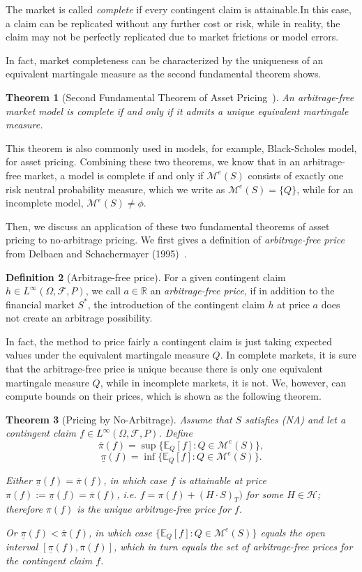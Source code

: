 \documentclass[a4paper]{article}
\newtheorem{theorem}{Theorem}[section]
\theoremstyle{definition}
\newtheorem{definition}[theorem]{Definition}
\numberwithin{equation}{section}
\begin{document}
The market is called \emph{complete} if every contingent claim is attainable.In this case, a claim can be replicated without any further cost or risk, while in reality, the claim may not be perfectly replicated due to market frictions or model errors.

In fact, market completeness can be characterized by the uniqueness of an equivalent martingale measure as the second fundamental theorem shows.
\begin{theorem}[Second Fundamental Theorem of Asset Pricing~\cite{book4}]
An arbitrage-free market model is complete if and only if it admits a unique equivalent martingale measure.
\end{theorem}
This theorem is also commonly used in models, for example, Black-Scholes model, for asset pricing. Combining these two theorems, we know that in an arbitrage-free market, a model is complete if and only if $\mathcal M^e(S)$ consists of exactly one risk neutral probability measure, which we write as $\mathcal M^e(S)=\{Q\}$, while for an incomplete model, $\mathcal M^e(S)\neq\phi$.
 
Then, we discuss an application of these two fundamental theorems of asset pricing to no-arbitrage pricing. We first gives a definition of \emph{arbitrage-free price} from Delbaen and Schachermayer (1995)~\cite{book1}.
\begin{definition}[Arbitrage-free price]
For a given contingent claim $h\in L^\infty(\Omega,\mathcal F,P)$, we call $a\in\mathbb R$ an \emph{arbitrage-free price}, if in addition to the financial market $S^*$, the introduction of the contingent claim $h$ at price $a$ does not create an arbitrage possibility.
\end{definition}
In fact, the method to price fairly a contingent claim is just taking expected values under the equivalent martingale measure $Q$. In complete markets, it is sure that the arbitrage-free price is unique because there is only one equivalent martingale measure $Q$, while in incomplete markets, it is not. We, however, can compute bounds on their prices, which is shown as the following theorem.

\begin{theorem}[Pricing by No-Arbitrage\cite{book paper}]\label{th:no_arbitrage_price}
Assume that $S$ satisfies (NA) and let a contingent claim $f\in L^\infty(\Omega,\mathcal F,P)$. Define
$$\overline\pi(f)=\sup\{\mathbb E_Q[f]:Q\in\mathcal M^e(S)\},$$
$$\underline\pi(f)=\inf\{\mathbb E_Q[f]:Q\in\mathcal M^e(S)\}.$$

Either $\underline\pi(f)=\overline\pi(f)$, in which case $f$ is attainable at price $\pi(f):=\underline\pi(f)=\overline\pi(f)$, i.e. $f=\pi(f)+(H\cdot S)_T)$ for some $H\in\mathcal H$; therefore $\pi(f)$ is the unique arbitrage-free price for $f$.

Or $\underline\pi(f)<\overline\pi(f)$, in which case $\{\mathbb E_Q[f]:Q\in\mathcal M^e(S)\}$ equals the open interval $[\underline\pi(f),\overline\pi(f)]$, which in turn equals the set of arbitrage-free prices for the contingent claim $f$.
\end{theorem}
\end{document}
